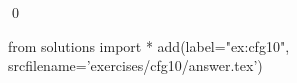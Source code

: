 
\begin{ex} 
  \label{ex:cfg10}
  
  \qed
\end{ex} 
\begin{python0}
from solutions import *
add(label="ex:cfg10",
    srcfilename='exercises/cfg10/answer.tex') 
\end{python0}
